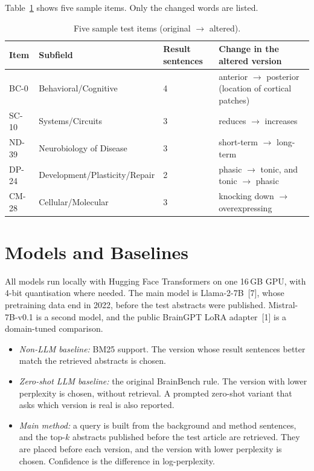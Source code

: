 \documentclass[10pt,a4paper]{article}
\begin{document}
Table~\ref{tab:samples} shows five sample items. Only the changed words are listed.

\begin{table}[h]
\centering\small
\caption{Five sample test items (original $\rightarrow$ altered).}
\label{tab:samples}
\begin{tabular}{lllp{6.2cm}}
\toprule
Item & Subfield & Result sentences & Change in the altered version\\
\midrule
BC-0   & Behavioral/Cognitive          & 4 & anterior $\rightarrow$ posterior (location of cortical patches)\\
SC-10  & Systems/Circuits              & 3 & reduces $\rightarrow$ increases\\
ND-39  & Neurobiology of Disease       & 3 & short-term $\rightarrow$ long-term\\
DP-24  & Development/Plasticity/Repair & 2 & phasic $\rightarrow$ tonic, and tonic $\rightarrow$ phasic\\
CM-28  & Cellular/Molecular            & 3 & knocking down $\rightarrow$ overexpressing\\
\bottomrule
\end{tabular}
\end{table}

\section{Models and Baselines}
All models run locally with Hugging Face Transformers on one 16\,GB GPU, with 4-bit quantisation where needed. The main model is Llama-2-7B~[7], whose pretraining data end in 2022, before the test abstracts were published. Mistral-7B-v0.1 is a second model, and the public BrainGPT LoRA adapter~[1] is a domain-tuned comparison.
\begin{itemize}
\item \emph{Non-LLM baseline:} BM25 support. The version whose result sentences better match the retrieved abstracts is chosen.
\item \emph{Zero-shot LLM baseline:} the original BrainBench rule. The version with lower perplexity is chosen, without retrieval. A prompted zero-shot variant that asks which version is real is also reported.
\item \emph{Main method:} a query is built from the background and method sentences, and the top-$k$ abstracts published before the test article are retrieved. They are placed before each version, and the version with lower perplexity is chosen. Confidence is the difference in log-perplexity.
\end{itemize}
\end{document}

